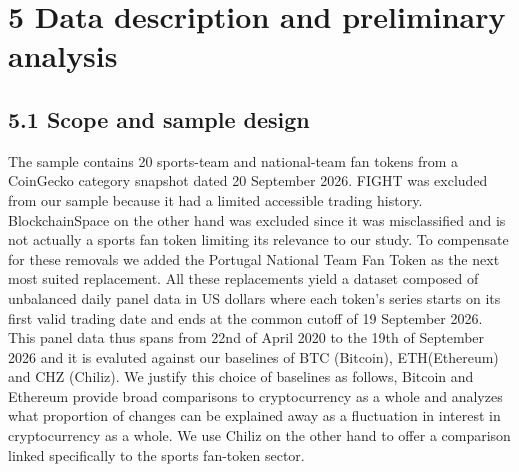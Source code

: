 \documentclass[11pt,a4paper,onecolumn]{article}
\begin{document}
\section{5 Data description and preliminary analysis}

\subsection{5.1 Scope and sample design}

The sample contains 20 sports-team and national-team fan tokens from a CoinGecko category snapshot dated 20 September 2026. FIGHT was excluded from our sample because it had a limited accessible trading history. BlockchainSpace on the other hand was excluded since it was misclassified and is not actually a sports fan token limiting its relevance to our study. To compensate for these removals we added the Portugal National Team Fan Token as the next most suited replacement. All these replacements yield a dataset composed of unbalanced daily panel data in US dollars where each token's series starts on its first valid trading date and ends at the common cutoff of 19 September 2026. This panel data thus spans from 22nd of April 2020 to the 19th of September 2026 and it is evaluted against our baselines of BTC (Bitcoin), ETH(Ethereum) and CHZ (Chiliz). We justify this choice of baselines as follows, Bitcoin and Ethereum provide broad comparisons to cryptocurrency as a whole and analyzes what proportion of changes can be explained away as a fluctuation in interest in cryptocurrency as a whole. We use Chiliz on the other hand to offer a comparison linked specifically to the sports fan-token sector.
\end{document}
